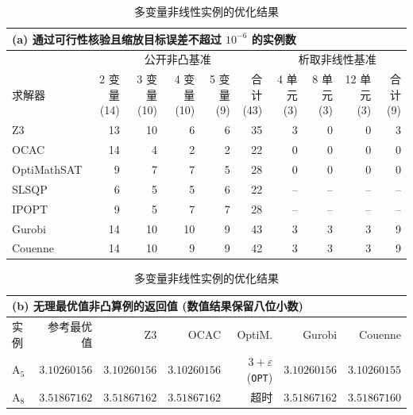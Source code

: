 \begin{table}[!htbp]
\centering
\caption{多变量非线性实例的优化结果}
\label{tab:exp-nra-multi}
\footnotesize
\setlength{\tabcolsep}{3pt}
\begin{tabular*}{\textwidth}{@{\extracolsep{\fill}}l*{9}{r}@{}}
\toprule
\multicolumn{10}{l}{\textbf{(a) 通过可行性核验且缩放目标误差不超过 $10^{-6}$ 的实例数}} \\
\midrule
& \multicolumn{5}{c}{公开非凸基准} & \multicolumn{4}{c}{析取非线性基准} \\
\cmidrule(lr){2-6}\cmidrule(lr){7-10}
求解器 & \shortstack{2 变量\\(14)} & \shortstack{3 变量\\(10)} & \shortstack{4 变量\\(10)} & \shortstack{5 变量\\(9)} & \shortstack{合计\\(43)} & \shortstack{4 单元\\(3)} & \shortstack{8 单元\\(3)} & \shortstack{12 单元\\(3)} & \shortstack{合计\\(9)} \\
\midrule
Z3 & 13 & 10 & 6 & 6 & 35 & 3 & 0 & 0 & 3 \\
OCAC & 14 & 4 & 2 & 2 & 22 & 0 & 0 & 0 & 0 \\
OptiMathSAT & 9 & 7 & 7 & 5 & 28 & 0 & 0 & 0 & 0 \\
\midrule
SLSQP & 6 & 5 & 5 & 6 & 22 & -- & -- & -- & -- \\
IPOPT & 9 & 5 & 7 & 7 & 28 & -- & -- & -- & -- \\
Gurobi & 14 & 10 & 10 & 9 & 43 & 3 & 3 & 3 & 9 \\
Couenne & 14 & 10 & 9 & 9 & 42 & 3 & 3 & 3 & 9 \\
\bottomrule
\end{tabular*}
\par\smallskip
\begin{tabular*}{\textwidth}{@{\extracolsep{\fill}}lrrrrrr@{}}
\toprule
\multicolumn{7}{l}{\textbf{(b) 无理最优值非凸算例的返回值 (数值结果保留八位小数)}} \\
\midrule
实例 & 参考最优值 & Z3 & OCAC & OptiM. & Gurobi & Couenne \\
\midrule
$\mathrm{A}_{5}$ & $3.10260156$ & $3.10260156$ & $3.10260156$ & $3+\varepsilon$ (\texttt{OPT}) & $3.10260156$ & $3.10260155$ \\
$\mathrm{A}_{8}$ & $3.51867162$ & $3.51867162$ & $3.51867162$ & 超时 & $3.51867162$ & $3.51867160$ \\

\end{tabular*}
\end{table}
